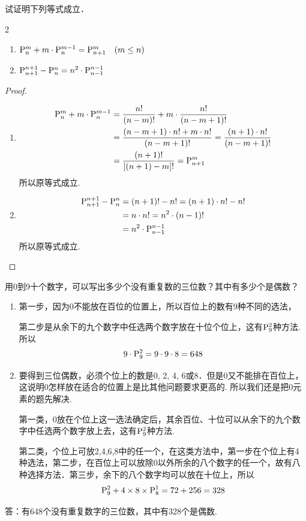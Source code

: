 \begin{example}
    试证明下列等式成立．
\begin{multicols}{2}
\begin{enumerate}[(1)]
    \item ${\rm P}^{m}_{n}+m\cdot {\rm P}^{m-1}_{n}={\rm P}^{m}_{n+1}\quad (m\le n)$
\item ${\rm P}^{n+1}_{n+1}-{\rm P}^{n}_{n}=n^2\cdot {\rm P}^{n-1}_{n-1}$
\end{enumerate}
\end{multicols}
\end{example}

\begin{proof}
\begin{enumerate}[(1)]
    \item \[\begin{split}
        {\rm P}^{m}_{n}+m\cdot {\rm P}^{m-1}_{n}&=\dfrac{n!}{(n-m)!}+m\cdot\dfrac{n!}{(n-m+1)!}\\
        &=\dfrac{(n-m+1)\cdot n!+m\cdot n!}{(n-m+1)!}=\dfrac{(n+1)\cdot n!}{(n-m+1)!}\\
        &=\dfrac{(n+1)!}{[(n+1)-m]!}={\rm P}^{m}_{n+1}
    \end{split}\]
所以原等式成立.

\item \[\begin{split}
    {\rm P}^{n+1}_{n+1}-{\rm P}^{n}_{n}&=(n+1)!-n!=(n+1)\cdot n!-n!\\
    &=n\cdot n!=n^2\cdot (n-1)!\\
    &=n^2\cdot {\rm P}^{n-1}_{n-1}
\end{split}\]
所以原等式成立.
\end{enumerate}
\end{proof}

\begin{example}
    用0到9十个数字，可以写出多少个没有重复数的三位数？其中有多少个是偶数？
\end{example}

\begin{solution}
\begin{enumerate}[(1)]
    \item 第一步，因为0不能放在百位的位置上，所以百位上的数有9种不同的选法，
    
第二步是从余下的九个数字中任选两个数字放在十位个位上，这有${\rm P}^{2}_{9}$种方法.所以
\[9\cdot {\rm P}^{2}_{9}=9\cdot 9\cdot 8=648\]
\item 要得到三位偶数，必须个位上的数是0, 2, 4, 6或8．但是0又不能排在百位上，这说明0怎样放在适合的位置上是比其他问题要求更高的. 所以我们还是把0元素的题先解决.

第一类，0放在个位上这一选法确定后，其余百位、十位可以从余下的九个数字中任选两个数字放上去，这有${\rm P}^{2}_{9}$种方法.

第二类，个位上可放2,4,6,8中的任一个，在这类方法中，第一步在个位上有4种选法，第二步，在百位上可以放除0以外所余的八个数字的任一个，故有八种选择方法．第三步，余下的八个数字均可以放在十位上，所以
\[{\rm P}^{2}_{9}+4\times8\times{\rm P}^{1}_{8}=72+256=328\]
\end{enumerate}
答：有648个没有重复数字的三位数，其中有328个是偶数.

\end{solution}

